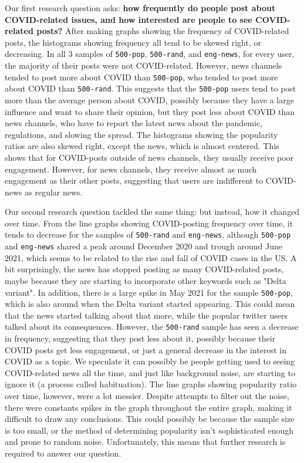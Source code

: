 \documentclass{article}
\begin{document}
    Our first research question asks: \textbf{how frequently do people post about COVID-related issues, and how interested are people to see COVID-related posts?}
    After making graphs showing the frequency of COVID-related posts, the histograms showing frequency all tend to be skewed right, or decreasing. In all 3 samples of \texttt{500-pop}, \texttt{500-rand}, and \texttt{eng-news}, for every user, the majority of their posts were not COVID-related. However, news channels tended to post more about COVID than \texttt{500-pop}, who tended to post more about COVID than \texttt{500-rand}. This suggests that the \texttt{500-pop} users tend to post more than the average person about COVID, possibly because they have a large influence and want to share their opinion, but they post less about COVID than news channels, who have to report the latest news about the pandemic, regulations, and slowing the spread.
    The histograms showing the popularity ratios are also skewed right, except the news, which is almost centered. This shows that for COVID-posts outside of news channels, they usually receive poor engagement. However, for news channels, they receive almost as much engagement as their other posts, suggesting that users are indifferent to COVID-news as regular news.
    
    Our second research question tackled the same thing: but instead, how it changed over time. From the line graphs showing COVID-posting frequency over time, it tends to decrease for the samples of \texttt{500-rand} and \texttt{eng-news}, although \texttt{500-pop} and \texttt{eng-news} shared a peak around December 2020 and trough around June 2021, which seems to be related to the rise and fall of COVID cases in the US. A bit surprisingly, the news has stopped posting as many COVID-related posts, maybe because they are starting to incorporate other keywords such as "Delta variant". In addition, there is a large spike in May 2021 for the sample \texttt{500-pop}, which is also around when the Delta variant started appearing. This could mean that the news started talking about that more, while the popular twitter users talked about its consequences. However, the \texttt{500-rand} sample has seen a decrease in frequency, suggesting that they post less about it, possibly because their COVID posts get less engagement, or just a general decrease in the interest in COVID as a topic. We speculate it can possibly be people getting used to seeing COVID-related news all the time, and just like background noise, are starting to ignore it (a process called habituation).
    The line graphs showing popularity ratio over time, however, were a lot messier. Despite attempts to filter out the noise, there were constants spikes in the graph throughout the entire graph, making it difficult to draw any conclusions. This could possibly be because the sample size is too small, or the method of determining popularity isn't sophisticated enough and prone to random noise. Unfortunately, this means that further research is required to answer our question.    
    
\nocite{*}
\printbibliography
\end{document}
